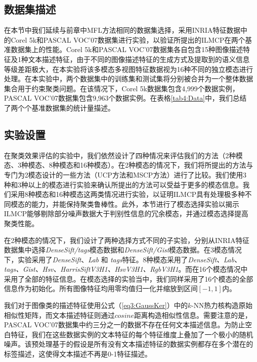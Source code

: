 \subsection{数据集描述}
在本节中我们延续与前章中MFL方法相同的数据集选择，采用INRIA特征数据\cite{guillaumin2009tagprop}中的Corel 5k和PASCAL VOC'07数据集进行实验，以验证所提出的ILMCP在两个基准数据集上的性能。Corel 5k和PASCAL VOC'07数据集各自包含15种图像描述特征及1种文本描述特征，由于不同的图像描述特征的生成方式及提取到的语义信息等级差距极大，在本实验将该多模态多视图特征数据视为16种不同的独立模态进行处理。在本实验中，两个数据集中的训练集和测试集将分别被合并为一个整体数据集合用于约束聚类问题。在该情况下，Corel 5k数据集包含4,999个数据实例，PASCAL VOC'07数据集包含9,963个数据实例。在表格\ref{tab4:Data}中，我们总结了两个个基准数据集的统计量描述。

\subsection{实验设置}

在聚类效果评估的实验中，我们依然设计了四种情况来评估我们的方法（2种模态、3种模态、8种模态和16种模态）。在2种模态的情况下，我们将所提出的方法与专门为2模态设计的一些方法（UCP方法和MSCP方法）进行了比较。我们使用3种和3种以上的模态进行实验来确认所提出的方法可以受益于更多的模态信息。我们采用8种模态和16种模态这两类情况进行实验，以证明ILMCP具有处理极多种不同模态的能力，并能保持聚类鲁棒性。此外，本节进行了模态选择实验以揭示ILMCP能够剔除部分噪声数据大于判别性信息的冗余模态，并通过模态选择提高聚类性能。

在2种模态的情况下，我们设计了两种选择方式不同的子实验，分别从INRIA特征数据集中选择\textit{DenseSift/tags}模态数据和\textit{DenseSift/Gist}模态数据。在3模态情况下，实验采用了\textit{DenseSift}、\textit{Lab} 和 \textit{tags}特征。8种模态采用了\textit{DenseSift、Lab、tags、Gist、Hsv、HarrisSiftV3H1、HsvV3H1、RgbV3H1}。而在16个模态情况中采用了全部的特征信息。在模态选择的实验当中，我们同样采用了16个模态的全部信息作为初始化。所有图像特征均用零均值归一化并缩放到区间$[-1,1] $内。

我们对于图像类的描述特征使用公式（\ref{eq3:GaussKer}）中的$k$-NN热力核构造原始相似性矩阵，而文本描述特征则通过$cosine$距离构造相似性信息。需要注意的是，PASCAL VOC'07数据集中约三分之一的数据不存在任何文本描述信息。为防止空白特征，我们在这些数据实例的文本特征的每个特征维度上叠加了一个极小的随机噪声。该预处理基于的假设是所有没有文本描述特征的数据实例都存在多个潜在的标签描述，这使得文本描述不再是0-1特征描述。


